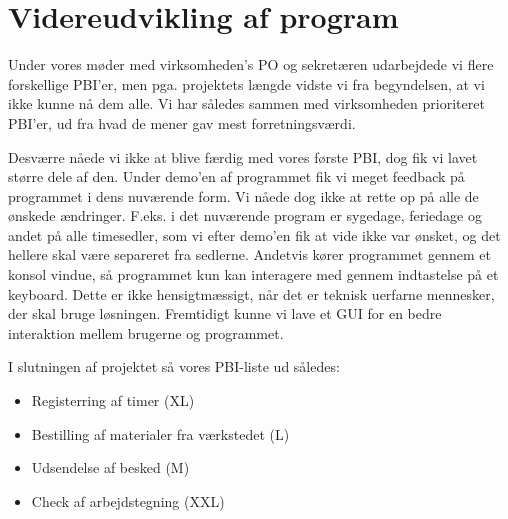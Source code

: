 \section{Videreudvikling af program}\label{vidud}

Under vores møder med virksomheden's PO og sekretæren udarbejdede vi flere forskellige PBI'er, men pga. projektets længde vidste vi fra begyndelsen, at vi ikke kunne nå dem alle.
Vi har således sammen med virksomheden prioriteret PBI'er, ud fra hvad de mener gav mest forretningsværdi.

Desværre nåede vi ikke at blive færdig med vores første PBI, dog fik vi lavet større dele af den.
Under demo'en af programmet fik vi meget feedback på programmet i dens nuværende form.
Vi nåede dog ikke at rette op på alle de ønskede ændringer.
F.eks. i det nuværende program er sygedage, feriedage og andet på alle timesedler, som vi efter demo'en fik at vide ikke var ønsket, og det hellere skal være separeret fra sedlerne.
Andetvis kører programmet gennem et konsol vindue, så programmet kun kan interagere med gennem indtastelse på et keyboard.
Dette er ikke hensigtmæssigt, når det er teknisk uerfarne mennesker, der skal bruge løsningen.
Fremtidigt kunne vi lave et GUI for en bedre interaktion mellem brugerne og programmet.

I slutningen af projektet så vores PBI-liste ud således:
\begin{itemize}
\item Registerring af timer (XL)
\item Bestilling af materialer fra værkstedet (L) 
\item Udsendelse af besked (M)
\item Check af arbejdstegning (XXL)
\end{itemize}


